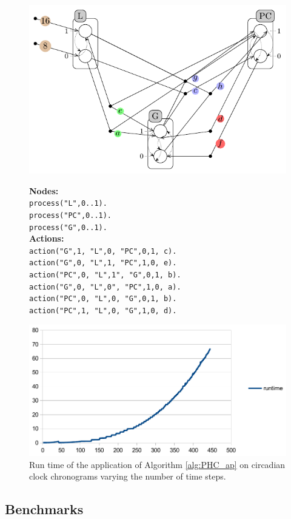 \begin{figure}

\includegraphics[width=0.4\linewidth]{images/circadianPH.pdf}
%
\hspace{1cm}
%
\begin{minipage}{0.5\linewidth}
	\textbf{Nodes:} \\
\texttt{{\footnotesize process("L",0..1).} }\\
\texttt{{\footnotesize process("PC",0..1).}}\\
\texttt{{\footnotesize process("G",0..1).} }\\

\textbf{Actions:} \\
\texttt{{\footnotesize action("G",1, "L",0, "PC",0,1, c).}} ~\\
\texttt{{\footnotesize action("G",0, "L",1, "PC",1,0, e).}} ~\\
\texttt{{\footnotesize action("PC",0, "L",1", "G",0,1, b).}} ~\\

\texttt{{\footnotesize action("G",0, "L",0", "PC",1,0, a).}} ~\\
\texttt{{\footnotesize action("PC",0, "L",0, "G",0,1, b).}} ~\\
\texttt{{\footnotesize action("PC",1, "L",0, "G",1,0, d).}} 
\end{minipage}
\end{figure}
%
\begin{figure}
\begin{center}
\includegraphics[width=0.6\linewidth]{images/run_time}
\end{center}
\caption{Run time of the application of  Algorithm \ref{alg:PHC_ap} on circadian clock chronograms varying the number of time steps.}
\end{figure}

\subsection{Benchmarks}
